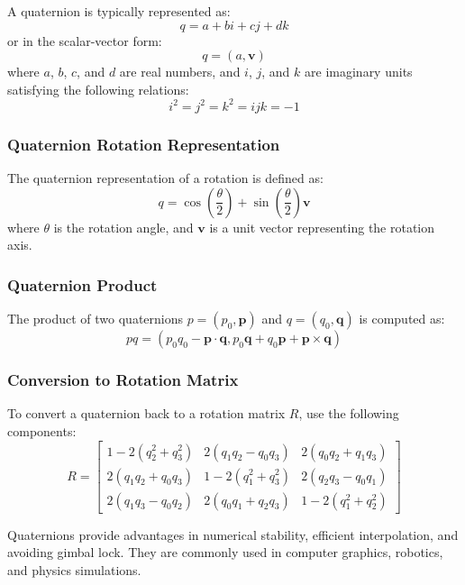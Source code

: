\documentclass[conference]{IEEEtran}
\begin{document}
A quaternion is typically represented as:
\[ q = a + bi + cj + dk \]
or in the scalar-vector form:
\[ q = (a, \mathbf{v}) \]
where $a$, $b$, $c$, and $d$ are real numbers, and $i$, $j$, and $k$ are imaginary units satisfying the following relations:
\[ i^2 = j^2 = k^2 = ijk = -1 \]

\vspace{10px}
\subsubsection{Quaternion Rotation Representation}

The quaternion representation of a rotation is defined as:
\[ q = \cos\left(\frac{\theta}{2}\right) + \sin\left(\frac{\theta}{2}\right) \mathbf{v} \]
where $\theta$ is the rotation angle, and $\mathbf{v}$ is a unit vector representing the rotation axis.

\vspace{10px}
\subsubsection{Quaternion Product}

The product of two quaternions $p = (p_0, \mathbf{p})$ and $q = (q_0, \mathbf{q})$ is computed as:
\[ pq = (p_0q_0 - \mathbf{p} \cdot \mathbf{q}, p_0\mathbf{q} + q_0\mathbf{p} + \mathbf{p} \times \mathbf{q}) \]

\vspace{10px}
\subsubsection{Conversion to Rotation Matrix}

To convert a quaternion back to a rotation matrix $R$, use the following components:
\[ R = \begin{bmatrix}
    1 - 2(q_2^2 + q_3^2) & 2(q_1q_2 - q_0q_3) & 2(q_0q_2 + q_1q_3) \\
    2(q_1q_2 + q_0q_3) & 1 - 2(q_1^2 + q_3^2) & 2(q_2q_3 - q_0q_1) \\
    2(q_1q_3 - q_0q_2) & 2(q_0q_1 + q_2q_3) & 1 - 2(q_1^2 + q_2^2)
\end{bmatrix} \]

Quaternions provide advantages in numerical stability, efficient interpolation, and avoiding gimbal lock. They are commonly used in computer graphics, robotics, and physics simulations.

\vspace{10px}
\end{document}
